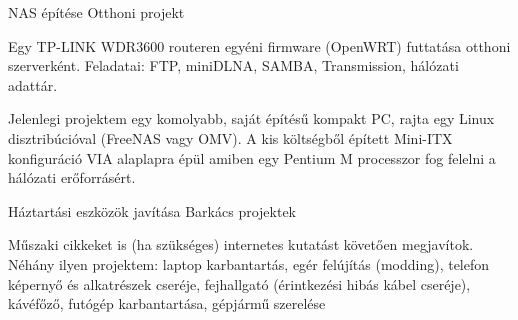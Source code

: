 \begin{cventries}
  \cventry
    {NAS építése} %
    {Otthoni projekt} %
    {} %
    {} %
    {
      \begin{cvitems} %
        \item {Egy TP-LINK WDR3600 routeren egyéni firmware (OpenWRT) futtatása otthoni szerverként. Feladatai: FTP, miniDLNA, SAMBA, Transmission,
        	hálózati adattár.}
        \item {Jelenlegi projektem egy komolyabb, saját építésű kompakt PC, rajta egy Linux disztribúcióval (FreeNAS vagy OMV). A kis költségből épített
        	Mini-ITX konfiguráció VIA alaplapra épül amiben egy Pentium M processzor fog felelni a hálózati erőforrásért.}
      \end{cvitems}
    }

  \cventry
    {Háztartási eszközök javítása} %
    {Barkács projektek} %
    {} %
    {} %
    {
      \begin{cvitems} %
        \item {Műszaki cikkeket is (ha szükséges) internetes kutatást követően megjavítok. \\
        	Néhány ilyen projektem: laptop karbantartás, egér felújítás (modding), telefon képernyő és alkatrészek cseréje, fejhallgató (érintkezési hibás kábel cseréje), kávéfőző, futógép karbantartása, gépjármű szerelése}
      \end{cvitems}
    }

\end{cventries}
